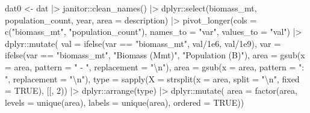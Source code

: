 \documentclass[
  letterpaper,
  oneside,
  open=any]{scrbook}
\newenvironment{Shaded}{\begin{snugshade}}{\end{snugshade}}
\newcommand{\AttributeTok}[1]{\textcolor[rgb]{0.40,0.45,0.13}{#1}}
\newcommand{\ConstantTok}[1]{\textcolor[rgb]{0.56,0.35,0.01}{#1}}
\newcommand{\DecValTok}[1]{\textcolor[rgb]{0.68,0.00,0.00}{#1}}
\newcommand{\FloatTok}[1]{\textcolor[rgb]{0.68,0.00,0.00}{#1}}
\newcommand{\FunctionTok}[1]{\textcolor[rgb]{0.28,0.35,0.67}{#1}}
\newcommand{\NormalTok}[1]{\textcolor[rgb]{0.00,0.23,0.31}{#1}}
\newcommand{\OtherTok}[1]{\textcolor[rgb]{0.00,0.23,0.31}{#1}}
\newcommand{\SpecialCharTok}[1]{\textcolor[rgb]{0.37,0.37,0.37}{#1}}
\newcommand{\StringTok}[1]{\textcolor[rgb]{0.13,0.47,0.30}{#1}}
\begin{document}
\begin{Shaded}
\begin{Highlighting}[]
\NormalTok{dat0 }\OtherTok{\textless{}{-}}\NormalTok{ dat }\SpecialCharTok{|\textgreater{}} 
\NormalTok{  janitor}\SpecialCharTok{::}\FunctionTok{clean\_names}\NormalTok{() }\SpecialCharTok{|\textgreater{}} 
\NormalTok{  dplyr}\SpecialCharTok{::}\FunctionTok{select}\NormalTok{(biomass\_mt, population\_count, year, }\AttributeTok{area =}\NormalTok{ description) }\SpecialCharTok{|\textgreater{}}
  \FunctionTok{pivot\_longer}\NormalTok{(}\AttributeTok{cols =} \FunctionTok{c}\NormalTok{(}\StringTok{"biomass\_mt"}\NormalTok{, }\StringTok{"population\_count"}\NormalTok{), }
               \AttributeTok{names\_to =} \StringTok{"var"}\NormalTok{, }
               \AttributeTok{values\_to =} \StringTok{"val"}\NormalTok{) }\SpecialCharTok{|\textgreater{}} 
\NormalTok{  dplyr}\SpecialCharTok{::}\FunctionTok{mutate}\NormalTok{(}
    \AttributeTok{val =} \FunctionTok{ifelse}\NormalTok{(var }\SpecialCharTok{==} \StringTok{"biomass\_mt"}\NormalTok{, val}\SpecialCharTok{/}\FloatTok{1e6}\NormalTok{, val}\SpecialCharTok{/}\FloatTok{1e9}\NormalTok{), }
    \AttributeTok{var =} \FunctionTok{ifelse}\NormalTok{(var }\SpecialCharTok{==} \StringTok{"biomass\_mt"}\NormalTok{, }\StringTok{"Biomass (Mmt)"}\NormalTok{, }\StringTok{"Population (B)"}\NormalTok{), }
    \AttributeTok{area =} \FunctionTok{gsub}\NormalTok{(}\AttributeTok{x =}\NormalTok{ area, }\AttributeTok{pattern =} \StringTok{" {-} "}\NormalTok{, }\AttributeTok{replacement =} \StringTok{"}\SpecialCharTok{\textbackslash{}n}\StringTok{"}\NormalTok{), }
    \AttributeTok{area =} \FunctionTok{gsub}\NormalTok{(}\AttributeTok{x =}\NormalTok{ area, }\AttributeTok{pattern =} \StringTok{": "}\NormalTok{, }\AttributeTok{replacement =} \StringTok{"}\SpecialCharTok{\textbackslash{}n}\StringTok{"}\NormalTok{), }
    \AttributeTok{type =} \FunctionTok{sapply}\NormalTok{(}\AttributeTok{X =} \FunctionTok{strsplit}\NormalTok{(}\AttributeTok{x =}\NormalTok{ area, }\AttributeTok{split =} \StringTok{"}\SpecialCharTok{\textbackslash{}n}\StringTok{"}\NormalTok{, }\AttributeTok{fixed =} \ConstantTok{TRUE}\NormalTok{), }\StringTok{\textasciigrave{}}\AttributeTok{[[}\StringTok{\textasciigrave{}}\NormalTok{, }\DecValTok{2}\NormalTok{))  }\SpecialCharTok{|\textgreater{}} 
\NormalTok{  dplyr}\SpecialCharTok{::}\FunctionTok{arrange}\NormalTok{(type) }\SpecialCharTok{|\textgreater{}} 
\NormalTok{  dplyr}\SpecialCharTok{::}\FunctionTok{mutate}\NormalTok{(}
    \AttributeTok{area =} \FunctionTok{factor}\NormalTok{(area, }\AttributeTok{levels =} \FunctionTok{unique}\NormalTok{(area), }\AttributeTok{labels =} \FunctionTok{unique}\NormalTok{(area), }\AttributeTok{ordered =} \ConstantTok{TRUE}\NormalTok{))}


\end{Highlighting}
\end{Shaded}
\end{document}

